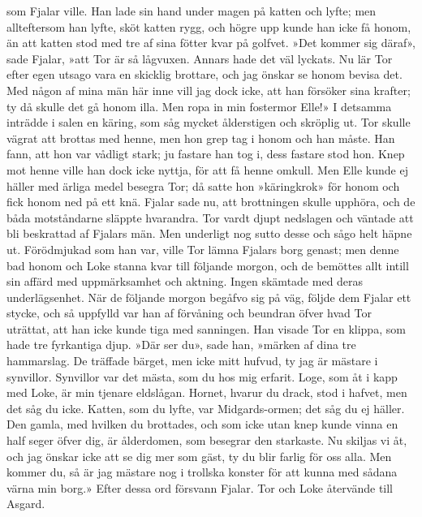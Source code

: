 som Fjalar ville. Han lade sin hand under magen på katten och lyfte; men
allteftersom han lyfte, sköt katten rygg, och högre upp kunde han icke
få honom, än att katten stod med tre af sina fötter kvar på golfvet.
»Det kommer sig däraf», sade Fjalar, »att Tor är så lågvuxen. Annars
hade det väl lyckats. Nu lär Tor efter egen utsago vara en skicklig
brottare, och jag önskar se honom bevisa det. Med någon af mina män här
inne vill jag dock icke, att han försöker sina krafter; ty då skulle det
gå honom illa. Men ropa in min fostermor Elle!» I detsamma inträdde i
salen en käring, som
såg mycket ålderstigen och skröplig ut. Tor skulle vägrat att brottas
med henne, men hon grep tag i honom och han måste. Han fann, att hon var
vådligt stark; ju fastare han tog i, dess fastare stod hon. Knep mot
henne ville han dock icke nyttja, för att få henne omkull. Men Elle
kunde ej häller med ärliga medel besegra Tor; då satte hon »käringkrok»
för honom och fick honom ned på ett knä. Fjalar sade nu, att brottningen
skulle upphöra, och de båda motståndarne släppte hvarandra. Tor vardt
djupt nedslagen och väntade att bli beskrattad af Fjalars män. Men
underligt nog sutto desse och sågo helt häpne ut. Förödmjukad som han
var, ville Tor lämna Fjalars borg genast; men denne bad honom och Loke
stanna kvar till följande morgon, och de bemöttes allt intill sin affärd
med uppmärksamhet och aktning. Ingen skämtade med deras underlägsenhet.
När de följande morgon begåfvo sig på väg, följde dem Fjalar ett stycke,
och så uppfylld var han af förvåning och beundran öfver hvad Tor
uträttat, att han icke kunde tiga med sanningen. Han visade Tor en
klippa, som hade tre fyrkantiga djup. »Där ser du», sade han, »märken af
dina tre hammarslag. De träffade bärget, men icke mitt hufvud, ty jag är
mästare i synvillor. Synvillor var det mästa, som du hos mig erfarit.
Loge, som åt i kapp med Loke, är min tjenare eldslågan. Hornet, hvarur
du drack, stod i hafvet, men det såg du icke. Katten, som du lyfte, var
Midgards-ormen; det såg du ej häller. Den gamla, med hvilken du
brottades, och som icke utan knep kunde vinna en half seger öfver dig,
är ålderdomen, som besegrar den starkaste. Nu skiljas vi åt, och jag
önskar icke att se dig mer som gäst, ty du blir farlig för oss alla. Men
kommer du, så är jag mästare nog i trollska konster för att kunna med
sådana värna min borg.» Efter dessa ord försvann Fjalar. Tor och Loke
återvände till Asgard.

